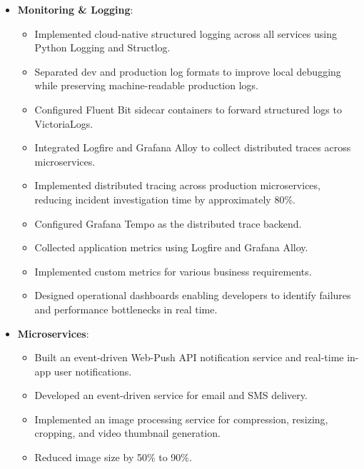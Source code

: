 \documentclass[10pt, dvipsnames, svgnames, x11names]{article}
\begin{document}
\begin{itemize}[nosep]
\item \textbf{Monitoring \& Logging}:
\begin{itemize}[nosep]
\item
Implemented cloud-native structured logging across all services using Python Logging and Structlog.

\item
Separated dev and production log formats to improve local debugging while preserving machine-readable production logs.

\item
Configured Fluent Bit sidecar containers to forward structured logs to VictoriaLogs.

\item 
Integrated Logfire and Grafana Alloy to collect distributed traces across microservices.

\item 
Implemented distributed tracing across production microservices, reducing incident investigation time by approximately 80\%.

\item 
Configured Grafana Tempo as the distributed trace backend.

\item 
Collected application metrics using Logfire and Grafana Alloy.

\item 
Implemented custom metrics for various business requirements.

\item 
Designed operational dashboards enabling developers to identify failures and performance bottlenecks in real time.
\end{itemize}

\item \textbf{Microservices}:
\begin{itemize}[nosep]
\item 
Built an event-driven Web-Push API notification service and real-time in-app user notifications.

\item 
Developed an event-driven service for email and SMS delivery.

\item 
Implemented an image processing service for compression, resizing, cropping, and video thumbnail generation.

\item Reduced image size by 50\% to 90\%.


\end{itemize}
\end{itemize}
\end{document}
